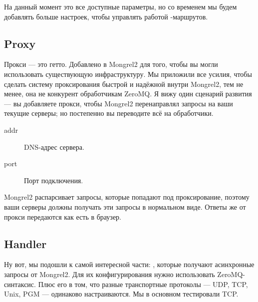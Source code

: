 На данный момент это все доступные параметры, но со временем мы будем
добавлять больше настроек, чтобы управлять работой
-маршрутов.

\subsection{Proxy}

Прокси --- это гетто. Добавлено в Mongrel2 для того, чтобы вы могли
использовать существующую инфраструктуру. Мы приложили все усилия,
чтобы сделать систему проксирования быстрой и надёжной внутри
Mongrel2, тем не менее, она не конкурент обработчикам ZeroMQ. Я вижу
один сценарий развития --- вы добавляете прокси, чтобы Mongrel2
перенаправлял запросы на ваши текущие серверы; но постепенно вы
переводите всё на обработчики.

\begin{description}
\item[addr] DNS-адрес сервера.
\item[port] Порт подключения.
\end{description}

Mongrel2 распарсивает запросы, которые попадают под проксирование,
поэтому ваши серверы должны получать эти запросы в нормальном виде.
Ответы же от прокси передаются как есть в браузер.

\subsection{Handler}

Ну вот, мы подошли к самой интересной части:
, которые получают асинхронные запросы от
Mongrel2. Для их конфигурирования нужно использовать ZeroMQ-синтаксис.
Плюс его в том, что разные транспортные протоколы --- UDP, TCP, Unix,
PGM --- одинаково настраиваются. Мы в основном тестировали TCP.

